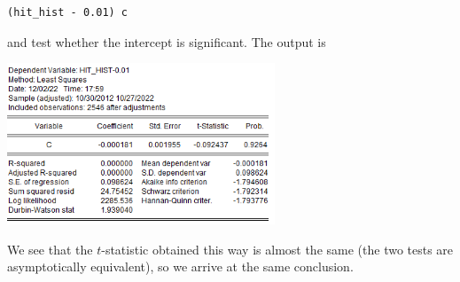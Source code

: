 \documentclass[11pt, a4paper]{article}
\begin{document}
\begin{enumerate}
\begin{verbatim}
(hit_hist - 0.01) c
\end{verbatim}
and test whether the intercept is significant. The output is
\begin{center}
\includegraphics[width=0.6\textwidth]{hit1}
\end{center}
We see that the $t$-statistic obtained this way is almost the same (the two tests are asymptotically equivalent), so we arrive at the same conclusion.


\end{enumerate}
\end{document}

